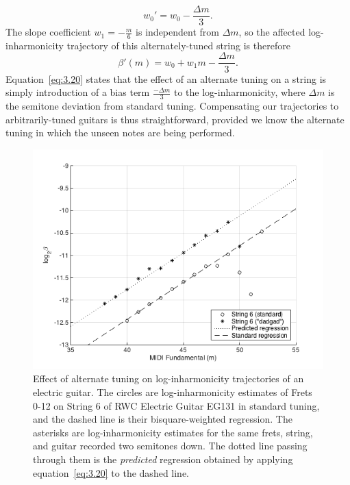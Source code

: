 \documentclass[convention,peer-reviewed]{aesconf}
\begin{document}
\begin{equation}
\label{eq:3.18}
w_{0}' = w_0 - \frac{\Delta m}{3}.
\end{equation}
The slope coefficient $w_1 = -\frac{m}{6}$ is independent from ${\Delta m}$, so the affected log-inharmonicity trajectory of this alternately-tuned string is therefore
\begin{equation}
\label{eq:3.20}
\beta'(m) = w_0 + w_1m - \frac{\Delta m}{3}.
\end{equation}
Equation~\eqref{eq:3.20} states that the effect of an alternate tuning on a string is simply introduction of a bias term $\frac{-\Delta m}{3}$ to the log-inharmonicity, where $\Delta m$ is the semitone deviation from standard tuning. Compensating our trajectories to arbitrarily-tuned guitars is thus straightforward, provided we know the alternate tuning in which the unseen notes are being performed. 

\begin{figure}[!htbp] 
\label{fig:tuning-eg}
\centering
\includegraphics[scale=0.35]{tuning-eg}
\caption{Effect of alternate tuning on log-inharmonicity trajectories of an electric guitar. The circles are log-inharmonicity estimates of Frets 0-12 on String 6 of RWC Electric Guitar EG131 in standard tuning, and the dashed line is their bisquare-weighted regression. The asterisks are log-inharmonicity estimates for the same frets, string, and guitar recorded two semitones down. The dotted line passing through them is the \textit{predicted} regression obtained by applying equation~\eqref{eq:3.20} to the dashed line.}
\end{figure}
\end{document}
